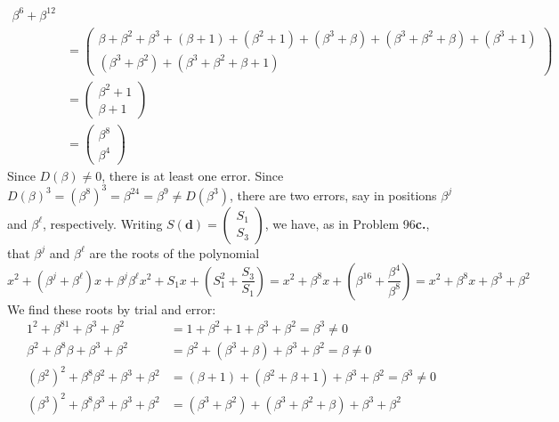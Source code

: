 \documentclass[11pt]{article}
\renewcommand{\vec}[1]{\mathbf{#1}}
\newcommand{\vc}[1]{\begin{pmatrix}#1\end{pmatrix}}
\begin{document}
\begin{itemize}
\begin{align*}
{                                      \beta^6 + \beta^{12}}\\
                               &= \vc{\beta   + \beta^2 + \beta^3 + (\beta+1)  +(\beta^2+1) +(\beta^3+\beta) + (\beta^3+\beta^2+\beta) + (\beta^3+1)\\
                                      (\beta^3+ \beta^2) + (\beta^3+\beta^2+\beta+1)}\\
                               &= \vc{\beta^2 + 1\\
                                      \beta+1}\\
                               &= \vc{\beta^8\\
                                      \beta^4}
                   \end{align*}
                   Since $D(\beta)\neq 0$, there is at least one error.
                   Since $D(\beta)^3 = (\beta^8)^3 = \beta^{24} = \beta^9 \neq D(\beta^3)$,
                   there are two errors, say in positions $\beta^j$ and $\beta^\ell$, respectively.
                   Writing $S(\vec{d}) = \vc{S_1\\S_3}$,
                   we have, as in Problem 96{\bf c.}, that
                   $\beta^j$ and $\beta^\ell$ are the roots of the polynomial
                   \[
                     x^2 + (\beta^j+\beta^\ell)x + \beta^j\beta^\ell
                     x^2 + S_1x + (S_1^2 + \frac{S_3}{S_1})
                   = x^2 + \beta^8x + (\beta^{16}+\frac{\beta^{4}}{\beta^8})
                   = x^2 + \beta^8x + \beta^3 + \beta^2
                   \]
                   We find these roots by trial and error:
                   \begin{align*}
                        1^2 + \beta^81    + \beta^3 + \beta^2
                     &= 1   + \beta^2 + 1 + \beta^3 + \beta^2
                      = \beta^3
                      \neq 0\\
                        \beta^2 + \beta^8\beta + \beta^3 + \beta^2
                     &= \beta^2 + (\beta^3 + \beta) + \beta^3 + \beta^2
                      = \beta
                      \neq 0\\
                        (\beta^2)^2 + \beta^8\beta^2 + \beta^3 + \beta^2
                     &= (\beta+1) + (\beta^2+\beta+1) + \beta^3 + \beta^2
                      =  \beta^3
                      \neq 0\\
                        (\beta^3)^2 + \beta^8\beta^3 + \beta^3 + \beta^2
                     &= (\beta^3 + \beta^2) + (\beta^3 + \beta^2+\beta) + \beta^3 + \beta^2

\end{align*}
\end{itemize}
\end{document}
